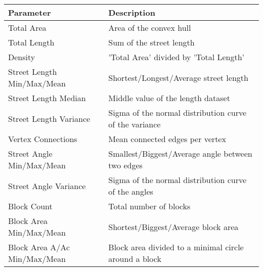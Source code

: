 \begin{table}[!ht]
\centering
\begin{tabular}{ | l | l |} \hline 
    \textbf{Parameter} & \textbf{Description} \\
    \hline
    Total Area &  Area of the convex hull \\ \hline
    Total Length & Sum of the street length \\ \hline
    Density & 'Total Area' divided by 'Total Length'  \\ \hline
    
    Street Length Min/Max/Mean & Shortest/Longest/Average street length  \\ \hline
    Street Length Median & Middle value of the length dataset \\ \hline
    Street Length Variance & Sigma of the normal distribution curve of the variance \\ \hline
    
    Vertex Connections & Mean connected edges per vertex  \\ \hline
    
    Street Angle Min/Max/Mean & Smallest/Biggest/Average angle between two edges \\ \hline
    Street Angle Variance & Sigma of the normal distribution curve of the angles \\ \hline
    
    Block Count & Total number of blocks \\ \hline
    Block Area Min/Max/Mean & Shortest/Biggest/Average block area \\ \hline
    Block Area A/Ac Min/Max/Mean & Block area divided to a minimal circle around a block \\ \hline
    

\end{tabular}
\end{table}
